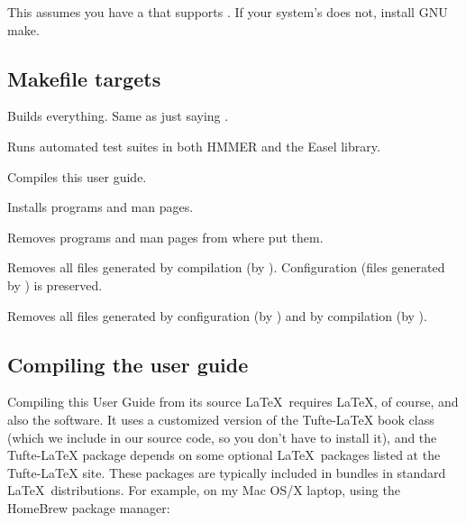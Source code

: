 This assumes you have a  that supports . If your
system's  does not, install GNU make.


\subsection{Makefile targets}

\begin{sreitems}{}

\item[\monob{all}]
  Builds everything. Same as just saying .

\item[\monob{check}]
  Runs automated test suites in both HMMER and the Easel library.

\item[\monob{pdf}]
  Compiles this user guide.

\item[\monob{install}]
  Installs programs and man pages.

\item[\monob{uninstall}]
  Removes programs and man pages from where  put them.

\item[\monob{clean}] Removes all files generated by compilation (by
  ). Configuration (files generated by )
  is preserved.

\item[\monob{distclean}]
  Removes all files generated by configuration (by )
  and by compilation (by ). 

\end{sreitems}


\subsection{Compiling the user guide}

Compiling this User Guide from its source \LaTeX\ requires \LaTeX, of
course, and also the  software.
It uses a customized version of the
Tufte-LaTeX book class
(which we include in our source code, so you don't have to
install it), and the Tufte-LaTeX package depends on some optional \LaTeX\ packages
listed at the
Tufte-LaTeX site.
These packages are typically included in bundles in
standard \LaTeX\ distributions.
For example, on my Mac OS/X laptop, using the HomeBrew
package manager:

